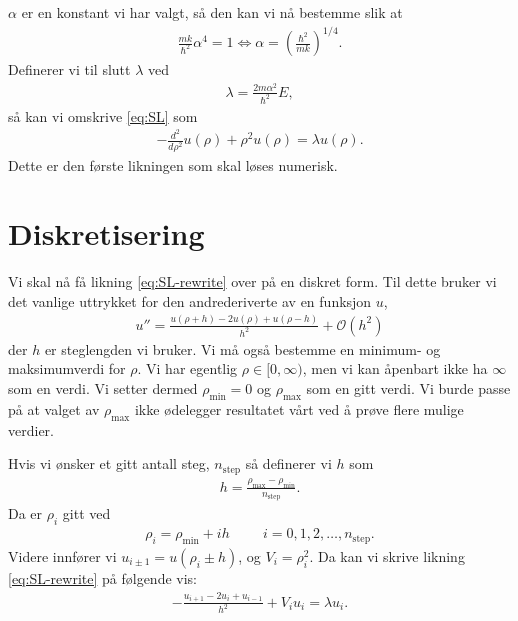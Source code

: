 \documentclass[11pt]{article}
\begin{document}
$\alpha$ er en konstant vi har valgt, så den kan vi nå bestemme slik
at 
\begin{align*}
  \frac{ mk }{ \hbar^2 }\alpha^4 = 1 \Leftrightarrow \alpha = \left(\frac{ \hbar^2 }{ mk }\right)^{1/4}.
\end{align*}
Definerer vi til slutt $\lambda$ ved
\begin{align*}
  \lambda = \frac{ 2m\alpha^2 }{ \hbar^2 }E,
\end{align*}
så kan vi omskrive \eqref{eq:SL} som
\begin{align}
  -\frac{ d^2 }{ d\rho^2 }u(\rho) + \rho^2u(\rho) = \lambda u(\rho).\label{eq:SL-rewrite}
\end{align}
Dette er den første likningen som skal løses numerisk.



\section{Diskretisering}
Vi skal nå få likning \eqref{eq:SL-rewrite} over på en diskret
form. Til dette bruker vi det vanlige uttrykket for den andrederiverte
av en funksjon $u$, 
\begin{align*}
  u'' = \frac{ u(\rho + h) - 2u(\rho) + u(\rho-h) }{ h^2 } + \mathcal{O}(h^2)
\end{align*}
der $h$ er steglengden vi bruker. Vi må også bestemme en minimum- og
maksimumverdi for $\rho$. Vi har egentlig $\rho\in [0,\infty)$, men vi
kan åpenbart ikke ha $\infty$ som en verdi. Vi setter dermed
$\rho_\text{min} = 0$ og $\rho_\text{max}$ som en gitt verdi. Vi burde passe på
at valget av $\rho_\text{max}$ ikke ødelegger resultatet vårt ved å prøve
flere mulige verdier. 

Hvis vi ønsker et gitt antall steg, $n_\text{step}$ så definerer vi $h$ som
\begin{align}
  h = \frac{ \rho_\text{max} - \rho_\text{min} }{ n_\text{step} }.\label{eq:h-def}
\end{align}
Da er $\rho_i$ gitt ved
\begin{align*}
  \rho_i = \rho_\text{min} + ih\hspace{1cm} i=0,1,2,\dots,n_\text{step}.
\end{align*}
Videre innfører vi $u_{i\pm 1} = u(\rho_i \pm h)$, og $V_i =
\rho_i^2$. Da kan vi skrive likning \eqref{eq:SL-rewrite} på
følgende vis:
\begin{align*}
  -\frac{ u_{i+1} - 2u_i + u_{i-1} }{ h^2 } + V_iu_i = \lambda u_i.
\end{align*}
\end{document}

